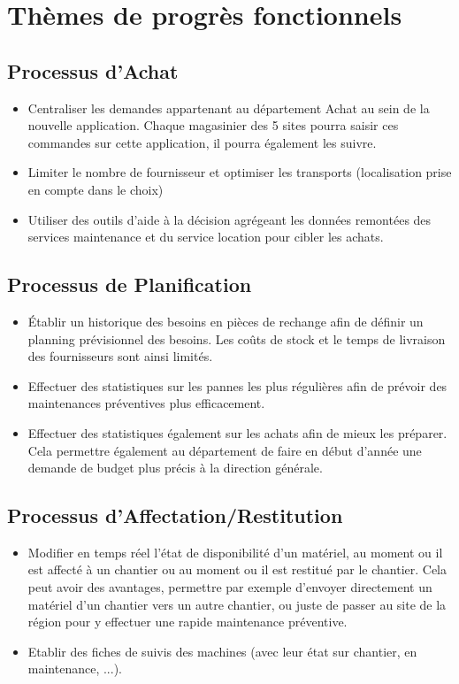 \section{Thèmes de progrès fonctionnels}
        \subsection{Processus d'Achat}
        \begin{itemize}
                \item Centraliser les demandes appartenant au département Achat au sein de la nouvelle application. 
				Chaque magasinier des 5 sites pourra saisir ces commandes sur cette application, il pourra également les suivre.
                \item Limiter le nombre de fournisseur et optimiser les transports (localisation prise en compte dans le choix)
				\item Utiliser des outils d'aide à la décision agrégeant les données remontées des services maintenance et 
				du service location pour cibler les achats.
        \end{itemize}

        \subsection{Processus de Planification}
        \begin{itemize}
                \item Établir un historique des besoins en pièces de rechange afin de définir un planning prévisionnel des besoins. Les coûts de stock et le temps de livraison des fournisseurs sont ainsi limités.
                \item Effectuer des statistiques sur les pannes les plus régulières afin de prévoir des maintenances préventives plus efficacement.
                \item Effectuer des statistiques également sur les achats afin de mieux les préparer. Cela permettre également au département de faire en début d'année une demande de budget plus précis à la direction générale.
        \end{itemize}

        \subsection{Processus d'Affectation/Restitution}
        \begin{itemize}
                \item Modifier en temps réel l'état de disponibilité d'un matériel, au moment ou il est affecté à un chantier ou au moment ou il est restitué par le chantier. Cela peut avoir des avantages, permettre par exemple d'envoyer directement un matériel d'un chantier vers un autre chantier, ou juste de passer au site de la région pour y effectuer une rapide maintenance préventive.
                \item Etablir des fiches de suivis des machines (avec leur état sur chantier, en maintenance, ...).
        \end{itemize}

